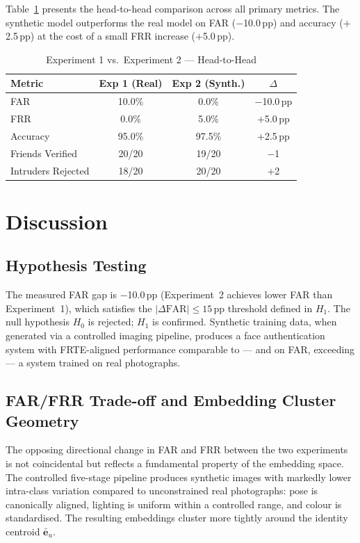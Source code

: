 \documentclass[conference]{IEEEtran}
\begin{document}
Table~\ref{tab:comparison} presents the head-to-head comparison across all primary metrics. The synthetic model outperforms the real model on FAR ($-$10.0\,pp) and accuracy ($+$2.5\,pp) at the cost of a small FRR increase ($+$5.0\,pp).

\begin{table}[H]
\centering
\caption{Experiment 1 vs.\ Experiment 2 — Head-to-Head}
\label{tab:comparison}
\renewcommand{\arraystretch}{1.2}
\begin{tabular}{lccc}
\toprule
Metric & Exp 1 (Real) & Exp 2 (Synth.) & $\Delta$ \\
\midrule
FAR & 10.0\% & 0.0\% & $-$10.0\,pp \\
FRR & 0.0\% & 5.0\% & $+$5.0\,pp \\
Accuracy & 95.0\% & 97.5\% & $+$2.5\,pp \\
Friends Verified & 20/20 & 19/20 & $-$1 \\
Intruders Rejected & 18/20 & 20/20 & $+$2 \\
\bottomrule
\end{tabular}
\end{table}

\section{Discussion}

\subsection{Hypothesis Testing}

The measured FAR gap is $-$10.0\,pp (Experiment~2 achieves lower FAR than Experiment~1), which satisfies the $|\Delta\text{FAR}| \leq 15\,\text{pp}$ threshold defined in $H_1$. The null hypothesis $H_0$ is rejected; $H_1$ is confirmed. Synthetic training data, when generated via a controlled imaging pipeline, produces a face authentication system with FRTE-aligned performance comparable to — and on FAR, exceeding — a system trained on real photographs.

\subsection{FAR/FRR Trade-off and Embedding Cluster Geometry}

The opposing directional change in FAR and FRR between the two experiments is not coincidental but reflects a fundamental property of the embedding space. The controlled five-stage pipeline produces synthetic images with markedly lower intra-class variation compared to unconstrained real photographs: pose is canonically aligned, lighting is uniform within a controlled range, and colour is standardised. The resulting embeddings cluster more tightly around the identity centroid $\bar{\mathbf{e}}_u$.
\end{document}
